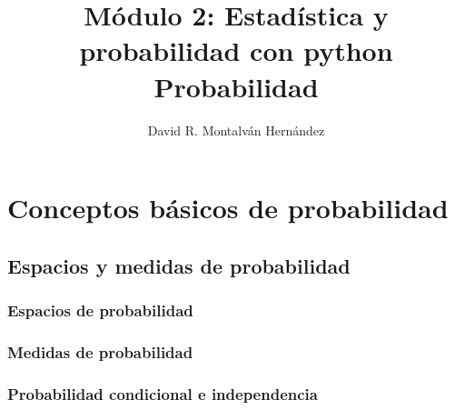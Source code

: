 \documentclass[11pt]{report}
\title{Módulo 2: Estadística y probabilidad con python \newline Probabilidad}
\author{David R. Montalván Hernández}
\date{}
\theoremstyle{break}
\theoremstyle{break}
\begin{document}
\sloppy %
\maketitle
\renewcommand{\contentsname}{Contenido}
\tableofcontents
\renewcommand{\listfigurename}{Lista de imágenes}
\listoffigures
\renewcommand{\listtablename}{Lista de tablas}
\renewcommand\tablename{Tabla}
\renewcommand{\bibname}{Referencias}
\renewcommand{\figurename}{Figura}
\renewcommand{\chaptername}{Capítulo}
\listoftables

\chapter{Conceptos básicos de probabilidad}
\label{capitulo:conceptos basicos}

\section{Espacios y medidas de probabilidad}
\label{seccion:espacios y medidas de probabilidad}

\subsection{Espacios de probabilidad}
\label{seccion:Espacios de probabilidad}

\subsection{Medidas de probabilidad}

\subsection{Probabilidad condicional e independencia}
\end{document}

